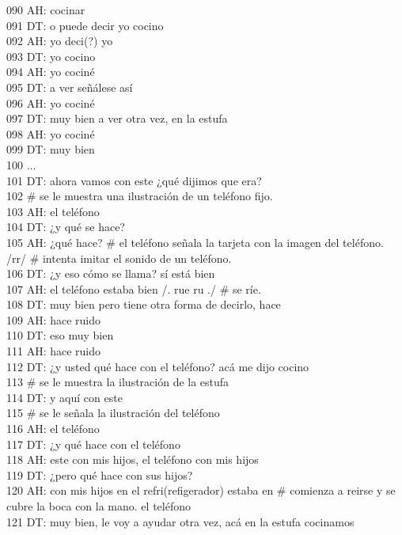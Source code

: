 090 AH: cocinar\\
091 DT: o puede decir yo cocino\\
092 AH: yo deci(?) yo\\
093 DT: yo cocino\\
094 AH: yo cociné\\
095 DT: a ver señálese así\\
096 AH: yo cociné\\
097 DT: muy bien a ver otra vez, en la estufa\\
098 AH: yo cociné \\
099 DT: muy bien\\
100 ...\\
101 DT: ahora vamos con este ¿qué dijimos que era?\\
102 \# se le muestra una ilustración de un teléfono fijo.\\
103 AH: el teléfono\\
104 DT: ¿y qué se hace?\\
105 AH: ¿qué hace? \# el teléfono señala la tarjeta con la imagen del teléfono. /rr/ \# intenta imitar el sonido de un teléfono.\\
106 DT: ¿y eso cómo se llama? sí está bien\\
107 AH: el teléfono estaba bien /. rue ru ./ \# se ríe.\\
108 DT: muy bien pero tiene otra forma de decirlo, hace\\
109 AH: hace ruido\\
110 DT: eso muy bien\\
111 AH: hace ruido \\
112 DT: ¿y usted qué hace con el teléfono? acá me dijo cocino\\
113 \# se le muestra la ilustración de la estufa\\
114 DT: y aquí con este\\
115 \# se le señala la ilustración del teléfono\\
116 AH: el teléfono\\
117 DT: ¿y qué hace con el teléfono\\
118 AH: este con mis hijos, el teléfono con mis hijos\\
119 DT: ¿pero qué hace con sus hijos?\\
120 AH: con mis hijos en el refri(refigerador) estaba en \# comienza a reirse y se cubre la boca con la mano. el teléfono\\
121 DT: muy bien, le voy a ayudar otra vez, acá en la estufa cocinamos\\
